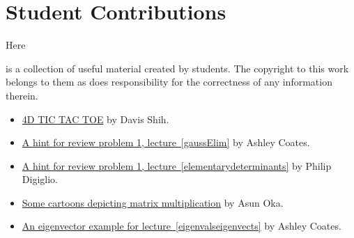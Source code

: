 \section{Student Contributions}

\hypertarget{student_creations}{Here} is a collection of useful material created by students. The copyright to this work belongs to them
as does responsibility for the correctness of any information therein.

\begin{itemize}
\item \href{http://math.ucdavis.edu/~linear/student_creations/TicTacToe.pdf}{4D TIC TAC TOE} by Davis Shih. 
\item \href{http://math.ucdavis.edu/~linear/student_creations/Lecture2Problem1.pdf}{A hint for review problem 1, lecture~\ref{gaussElim}} by Ashley Coates.
\item \href{http://math.ucdavis.edu/~linear/student_creations/Lecture12Problem1.pdf}{A hint for review problem 1, lecture~\ref{elementarydeterminants}} by Philip Digiglio.
\item \href{http://math.ucdavis.edu/~linear/student_creations/MatrixCartoons.pdf}{Some cartoons depicting matrix multiplication} by Asun Oka.
\item \href{http://math.ucdavis.edu/~linear/student_creations/Content+Creation+2+Lecture+18+example.pdf}{An eigenvector example for lecture~\ref{eigenvalseigenvects}} by Ashley Coates.
\end{itemize}

\newpage